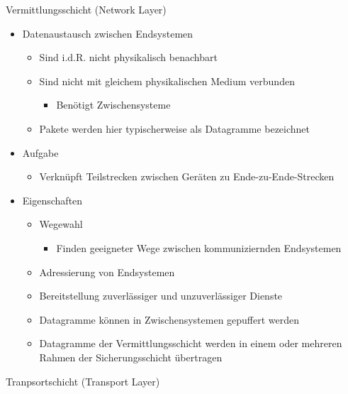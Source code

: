     Vermittlungsschicht (Network Layer)
    \begin{itemize}
      \item Datenaustausch zwischen Endsystemen
        \begin{itemize}
          \item Sind i.d.R. nicht physikalisch benachbart
          \item Sind nicht mit gleichem physikalischen Medium verbunden
            \begin{itemize}
              \item Benötigt Zwischensysteme
            \end{itemize}
          \item Pakete werden hier typischerweise als Datagramme bezeichnet
        \end{itemize}
      \item Aufgabe
        \begin{itemize}
          \item Verknüpft Teilstrecken zwischen Geräten zu Ende-zu-Ende-Strecken
        \end{itemize}
      \item Eigenschaften
        \begin{itemize}
          \item Wegewahl
            \begin{itemize}
              \item Finden geeigneter Wege zwischen kommuniziernden Endsystemen
            \end{itemize}
          \item Adressierung von Endsystemen
          \item Bereitstellung zuverlässiger und unzuverlässiger Dienste
          \item Datagramme können in Zwischensystemen gepuffert werden
          \item Datagramme der Vermittlungsschicht werden in einem oder mehreren Rahmen der
            Sicherungsschicht übertragen
        \end{itemize}
    \end{itemize}
    Tranpsortschicht (Transport Layer)
